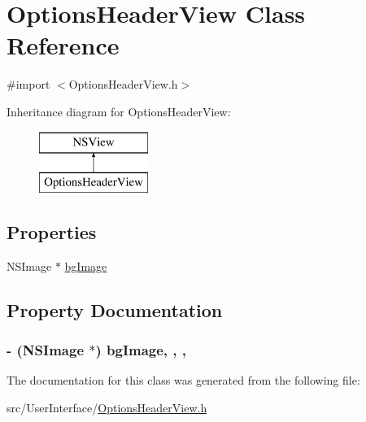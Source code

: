 \hypertarget{interface_options_header_view}{\section{Options\-Header\-View Class Reference}
\label{interface_options_header_view}
}


{\ttfamily \#import $<$Options\-Header\-View.\-h$>$}

Inheritance diagram for Options\-Header\-View\-:\begin{figure}[H]
\begin{center}
\leavevmode
\includegraphics[height=2.000000cm]{interface_options_header_view}
\end{center}
\end{figure}
\subsection*{Properties}
\begin{DoxyCompactItemize}
\item 
N\-S\-Image $\ast$ \hyperlink{interface_options_header_view_a3e7c34f89ce1e643154582b06fd6043e}{bg\-Image}
\end{DoxyCompactItemize}


\subsection{Property Documentation}
\hypertarget{interface_options_header_view_a3e7c34f89ce1e643154582b06fd6043e}{
\subsubsection[{bg\-Image}]{\setlength{\rightskip}{0pt plus 5cm}-\/ (N\-S\-Image $\ast$) bg\-Image\hspace{0.3cm}{\ttfamily [read]}, {\ttfamily [write]}, {\ttfamily [atomic]}, {\ttfamily [retain]}}}\label{interface_options_header_view_a3e7c34f89ce1e643154582b06fd6043e}


The documentation for this class was generated from the following file\-:\begin{DoxyCompactItemize}
\item 
src/\-User\-Interface/\hyperlink{_options_header_view_8h}{Options\-Header\-View.\-h}\end{DoxyCompactItemize}
